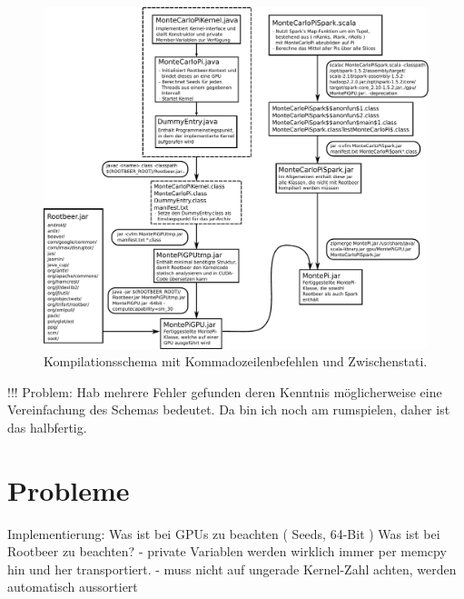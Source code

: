 \begin{figure}[H]
	\centering
	\begin{minipage}{\linewidth}
		\includegraphics[width=\linewidth]{compile-structure-deu.pdf}
	\end{minipage}
	\caption{Kompilationsschema mit Kommadozeilenbefehlen und Zwischenstati.}
	\label{fig:compilation}
\end{figure}

!!! Problem: Hab mehrere Fehler gefunden deren Kenntnis möglicherweise eine Vereinfachung des Schemas bedeutet. Da bin ich noch am rumspielen, daher ist das halbfertig.

\section{Probleme}
Implementierung:
    Was ist bei GPUs zu beachten ( Seeds, 64-Bit )
    Was ist bei Rootbeer zu beachten?
      - private Variablen werden wirklich immer per memcpy hin und her transportiert.
      - muss nicht auf ungerade Kernel-Zahl achten, werden automatisch aussortiert
